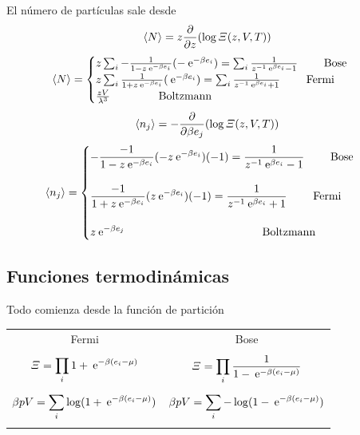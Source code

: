 \documentclass[10pt,oneside]{CBFT_book}
\begin{document}
\begin{itemize}
El número de partículas sale desde 
\[
	\braket{N} = z\frac{\partial^{\hspace{-0.05em}} {}}{\partial {z}^{\hspace{-0.05em}}} ( \log \Xi(z,V,T) )
\]
\[
	\braket{N} = \begin{cases}
	             z \sum_i -\frac{1}{1-z\:\mathrm{e}^{-\beta e_i}} (-\:\mathrm{e}^{-\beta e_i}) =
	             \sum_i \frac{1}{ z^{-1}\:\mathrm{e}^{\beta e_i} - 1 } \qquad \text{ Bose } \\
	             z \sum_i \frac{1}{1+z\:\mathrm{e}^{-\beta e_i}} (\:\mathrm{e}^{-\beta e_i}) =
	             \sum_i \frac{1}{ z^{-1}\:\mathrm{e}^{\beta e_i} + 1 } \qquad  \text{ Fermi } \\
	             \frac{zV}{\lambda^3} \qquad \qquad \text{ Boltzmann }
	             \end{cases}
\]
\[
	\braket{n_j} = -\frac{\partial^{\hspace{-0.05em}} {}}{\partial {\beta e_j}^{\hspace{-0.05em}}} ( \log \Xi(z,V,T) )
\]
\[ 
	\braket{n_j} = \begin{cases}
	 \displaystyle   -\frac{-1}{1-z\:\mathrm{e}^{-\beta e_i}} (-z\:\mathrm{e}^{-\beta e_i})(-1) =
			\frac{1}{ z^{-1}\:\mathrm{e}^{\beta e_i} - 1 } \qquad \text{ Bose } \\
			\\
	 \displaystyle    \frac{-1}{1+z\:\mathrm{e}^{-\beta e_i}} (z\:\mathrm{e}^{-\beta e_i})(-1) =
	             \frac{1}{ z^{-1}\:\mathrm{e}^{\beta e_i} + 1 } \qquad  \text{ Fermi } \\
	             \\
	 \displaystyle  z \:\mathrm{e}^{-\beta e_j} \qquad \qquad \qquad \qquad \qquad \qquad \text{ Boltzmann }
	             \end{cases}
\]
\end{itemize}


\subsection{Funciones termodinámicas}

Todo comienza desde la función de partición

\begin{center}
\begin{tabular}{c|c}
 Fermi &  Bose \\
  & \\
$ \displaystyle \Xi = \prod_i 1 + \:\mathrm{e}^{-\beta(e_i - \mu)} $ & 
$ \displaystyle \Xi = \prod_i \frac{1}{1 - \:\mathrm{e}^{-\beta(e_i - \mu)}} $ \\
  & \\
$ \displaystyle \beta p V = \sum_i \log (1 + \:\mathrm{e}^{-\beta(e_i - \mu)}) $  & 
$ \displaystyle \beta p V = \sum_i -\log (1 - \:\mathrm{e}^{-\beta(e_i - \mu)}) $ \\
 & 
\end{tabular}
\end{center}
\end{document}
